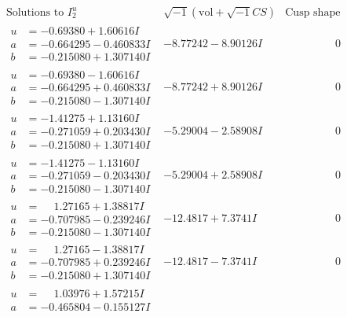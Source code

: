 \documentclass[1p]{elsarticle_modified}
\theoremstyle{definition}
\newcommand{\I}{\sqrt{-1}}
\begin{document}
$$\begin{array}{c|c|c}
\text{Solutions to }I^u_{2}& \I (\text{vol} + \sqrt{-1}CS) & \text{Cusp shape}\\
 \hline 
\begin{aligned}
u &= -0.69380 + 1.60616 I \\
a &= -0.664295 - 0.460833 I \\
b &= -0.215080 + 1.307140 I\end{aligned}
 & -8.77242 - 8.90126 I & \phantom{-0.000000 } 0 \\ \hline\begin{aligned}
u &= -0.69380 - 1.60616 I \\
a &= -0.664295 + 0.460833 I \\
b &= -0.215080 - 1.307140 I\end{aligned}
 & -8.77242 + 8.90126 I & \phantom{-0.000000 } 0 \\ \hline\begin{aligned}
u &= -1.41275 + 1.13160 I \\
a &= -0.271059 + 0.203430 I \\
b &= -0.215080 + 1.307140 I\end{aligned}
 & -5.29004 - 2.58908 I & \phantom{-0.000000 } 0 \\ \hline\begin{aligned}
u &= -1.41275 - 1.13160 I \\
a &= -0.271059 - 0.203430 I \\
b &= -0.215080 - 1.307140 I\end{aligned}
 & -5.29004 + 2.58908 I & \phantom{-0.000000 } 0 \\ \hline\begin{aligned}
u &= \phantom{-}1.27165 + 1.38817 I \\
a &= -0.707985 - 0.239246 I \\
b &= -0.215080 - 1.307140 I\end{aligned}
 & -12.4817 + 7.3741 I & \phantom{-0.000000 } 0 \\ \hline\begin{aligned}
u &= \phantom{-}1.27165 - 1.38817 I \\
a &= -0.707985 + 0.239246 I \\
b &= -0.215080 + 1.307140 I\end{aligned}
 & -12.4817 - 7.3741 I & \phantom{-0.000000 } 0 \\ \hline\begin{aligned}
u &= \phantom{-}1.03976 + 1.57215 I \\
a &= -0.465804 - 0.155127 I \\

\end{aligned}
\end{array}$$
\end{document}
